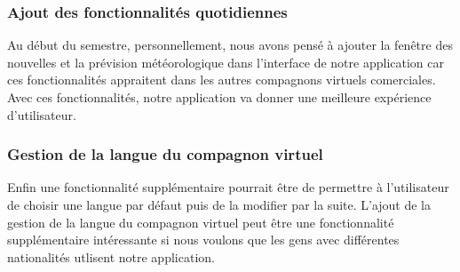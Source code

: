 \subsubsection{Ajout des fonctionnalités quotidiennes}
\indent Au début du semestre, personnellement, nous avons pensé à ajouter la fenêtre des nouvelles et la prévision météorologique dans l'interface de notre application car ces fonctionnalités appraitent dans les autres compagnons virtuels comerciales. Avec ces fonctionnalités, notre application va donner une meilleure expérience d'utilisateur.

\subsubsection{Gestion de la langue du compagnon virtuel}
\indent Enfin une fonctionnalité supplémentaire pourrait être de permettre à l'utilisateur de choisir une langue par défaut puis de la modifier par la suite. L'ajout de la gestion de la langue du compagnon virtuel peut être une fonctionnalité supplémentaire intéressante si nous voulons que les gens avec différentes nationalités utlisent notre application.
